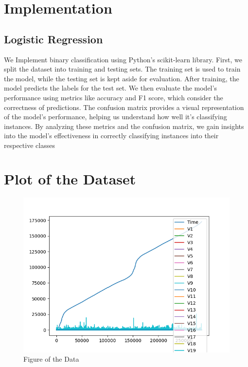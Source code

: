 \section{Implementation}
\subsection{Logistic Regression}
 We Implement binary classification using Python's scikit-learn library. First, we split the dataset into training and testing sets. The training set is used to train the model, while the testing set is kept aside for evaluation. After training, the model predicts the labels for the test set. We then evaluate the model's performance using metrics like accuracy and F1 score, which consider the correctness of predictions. The confusion matrix provides a visual representation of the model's performance, helping us understand how well it's classifying instances. By analyzing these metrics and the confusion matrix, we gain insights into the model's effectiveness in correctly classifying instances into their respective classes


\section{Plot of the Dataset}


\begin{figure}[ht]
    \centering
    \includegraphics[scale=0.3]{figures/BasicPlot.png}
    \caption{Figure of the Data}
    \label{fig:Plot of the Data}
\end{figure}
\

